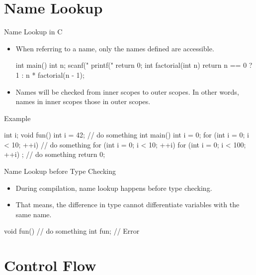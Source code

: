 \documentclass{beamer}
\begin{document}
\section{Name Lookup}

\begin{frame}[fragile]{Name Lookup in C}
	\begin{itemize}
		\item When referring to a name, only the names defined  are accessible.
		\begin{cpp}
int main() {
  int n; scanf("%
  printf("%
  return 0;
}
int factorial(int n) {
  return n == 0 ? 1 : n * factorial(n - 1);
}
		\end{cpp}
		\item Names will be checked from inner scopes to outer scopes. In other words, names in inner scopes  those in outer scopes.
	\end{itemize}
\end{frame}

\begin{frame}[fragile]{Example}
	\begin{cpp}
int i;
void fun() {
  int i = 42;
  // do something
}
int main() {
  int i = 0;
  for (int i = 0; i < 10; ++i) {
    // do something
  }
  for (int i = 0; i < 10; ++i)
    for (int i = 0; i < 100; ++i)
      ; // do something
  return 0;
}
	\end{cpp}
\end{frame}

\begin{frame}[fragile]{Name Lookup before Type Checking}
	\begin{itemize}
		\item During compilation, name lookup happens before type checking.
		\item That means, the difference in type cannot differentiate variables with the same name.
	\end{itemize}
	\begin{cpp}
void fun() {
  // do something
}
int fun; // Error
	\end{cpp}
\end{frame}

\section{Control Flow}
\end{document}
